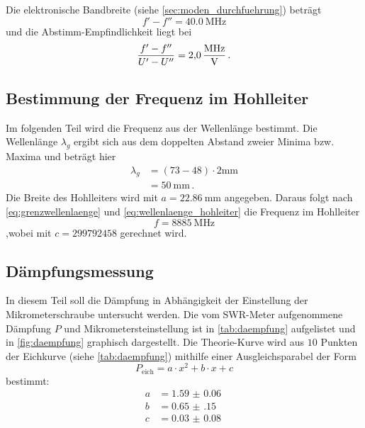 Die elektronische Bandbreite (siehe \autoref{sec:moden_durchfuehrung}) beträgt
\begin{equation*}
    f' - f'' = \SI{40.0}{\mega\hertz}
\end{equation*}
und die Abstimm-Empfindlichkeit liegt bei
\begin{equation*}
    \frac{f' - f''}{U' - U''} = \SI{2.0}{\frac{\mega\hertz}{\volt}} \, .
\end{equation*}

\subsection{Bestimmung der Frequenz im Hohlleiter}
Im folgenden Teil wird die Frequenz aus der Wellenlänge bestimmt.
Die Wellenlänge $\lambda_g$ ergibt sich aus dem doppelten Abstand zweier Minima bzw. Maxima und beträgt hier
\begin{align*}
    \lambda_g &= (73 - 48) \cdot 2 \si{\milli \metre} \\
    &= \SI{50}{\milli \metre} \, .
\end{align*}
Die Breite des Hohlleiters wird mit $a = \SI{22.86}{\milli \metre}$ angegeben.
Daraus folgt nach \autoref{eq:grenzwellenlaenge} und \autoref{eq:wellenlaenge_hohleiter} die Frequenz im Hohlleiter
\begin{equation*}
    f = \SI{8885}{\mega\hertz}
\end{equation*}
,wobei mit $c = 299792458$ gerechnet wird.

\subsection{Dämpfungsmessung}
In diesem Teil soll die Dämpfung in Abhängigkeit der Einstellung der Mikrometerschraube untersucht werden.
Die vom SWR-Meter aufgenommene Dämpfung $P$ und Mikrometersteinstellung ist in \autoref{tab:daempfung} aufgelistet und in \autoref{fig:daempfung} graphisch dargestellt.
Die Theorie-Kurve wird aus $10$ Punkten der Eichkurve (siehe \autoref{tab:daempfung}) mithilfe einer Ausgleichsparabel der Form
\begin{equation*}
    P_\text{eich} = a \cdot x^2 + b \cdot x + c 
\end{equation*}
bestimmt:
\begin{align*}
    a &= \SI{1.59(6)}{} \\
    b &= \SI{0.65(15)}{} \\
    c &= \SI{0.03(8)}{}
\end{align*}


